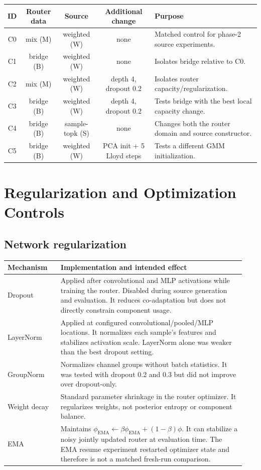 \documentclass[11pt,a4paper]{article}
\begin{document}
\begin{center}
\small
\setlength{\tabcolsep}{4pt}
\begin{tabularx}{\linewidth}{@{}c c c c Y@{}}
\toprule
\textbf{ID} & \textbf{Router data} & \textbf{Source} &
\textbf{Additional change} & \textbf{Purpose}\\
\midrule
C0 & mix (M) & weighted (W) & none &
Matched control for phase-2 source experiments.\\
C1 & bridge (B) & weighted (W) & none &
Isolates bridge relative to C0.\\
C2 & mix (M) & weighted (W) & depth 4, dropout 0.2 &
Isolates router capacity/regularization.\\
C3 & bridge (B) & weighted (W) & depth 4, dropout 0.2 &
Tests bridge with the best local capacity change.\\
C4 & bridge (B) & sample-topk (S) & none &
Changes both the router domain and source constructor.\\
C5 & bridge (B) & weighted (W) & PCA init + 5 Lloyd steps &
Tests a different GMM initialization.\\
\bottomrule
\end{tabularx}
\end{center}

\section{Regularization and Optimization Controls}

\subsection{Network regularization}

\begin{longtable}{@{}p{0.21\linewidth}p{0.73\linewidth}@{}}
\toprule
\textbf{Mechanism} & \textbf{Implementation and intended effect}\\
\midrule
\endhead
Dropout &
Applied after convolutional and MLP activations while training the router.
Disabled during source generation and evaluation. It reduces co-adaptation but
does not directly constrain component usage.\\
\addlinespace
LayerNorm &
Applied at configured convolutional/pooled/MLP locations. It normalizes each
sample's features and stabilizes activation scale. LayerNorm alone was weaker
than the best dropout setting.\\
\addlinespace
GroupNorm &
Normalizes channel groups without batch statistics. It was tested with dropout
0.2 and 0.3 but did not improve over dropout-only.\\
\addlinespace
Weight decay &
Standard parameter shrinkage in the router optimizer. It regularizes weights,
not posterior entropy or component balance.\\
\addlinespace
EMA &
Maintains
\(\phi_{\mathrm{EMA}}\leftarrow\beta\phi_{\mathrm{EMA}}+
(1-\beta)\phi\).
It can stabilize a noisy jointly updated router at evaluation time. The EMA
resume experiment restarted optimizer state and therefore is not a matched
fresh-run comparison.\\
\bottomrule
\end{longtable}
\end{document}
